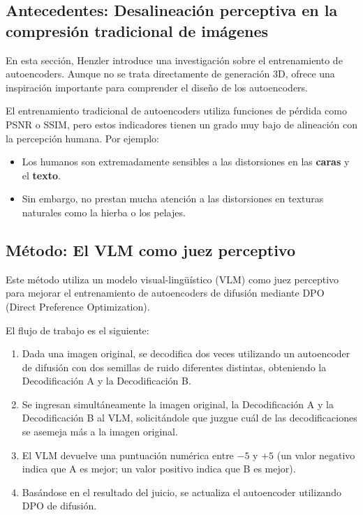 \documentclass[a4paper]{article}
\begin{document}
\subsection{Antecedentes: Desalineación perceptiva en la compresión tradicional de imágenes}

En esta sección, Henzler introduce una investigación sobre el entrenamiento de autoencoders. Aunque no se trata directamente de generación 3D, ofrece una inspiración importante para comprender el diseño de los autoencoders.

El entrenamiento tradicional de autoencoders utiliza funciones de pérdida como PSNR o SSIM, pero estos indicadores tienen un grado muy bajo de alineación con la percepción humana. Por ejemplo:

\begin{itemize}
    \item Los humanos son extremadamente sensibles a las distorsiones en las \textbf{caras} y el \textbf{texto}.
    \item Sin embargo, no prestan mucha atención a las distorsiones en texturas naturales como la hierba o los pelajes.
\end{itemize}

\subsection{Método: El VLM como juez perceptivo}

Este método utiliza un modelo visual-lingüístico (VLM) como juez perceptivo para mejorar el entrenamiento de autoencoders de difusión mediante DPO (Direct Preference Optimization).

El flujo de trabajo es el siguiente:

\begin{enumerate}
    \item Dada una imagen original, se decodifica dos veces utilizando un autoencoder de difusión con dos semillas de ruido diferentes distintas, obteniendo la Decodificación A y la Decodificación B.
    \item Se ingresan simultáneamente la imagen original, la Decodificación A y la Decodificación B al VLM, solicitándole que juzgue cuál de las decodificaciones se asemeja más a la imagen original.
    \item El VLM devuelve una puntuación numérica entre $-5$ y $+5$ (un valor negativo indica que A es mejor; un valor positivo indica que B es mejor).
    \item Basándose en el resultado del juicio, se actualiza el autoencoder utilizando DPO de difusión.
\end{enumerate}
\end{document}
